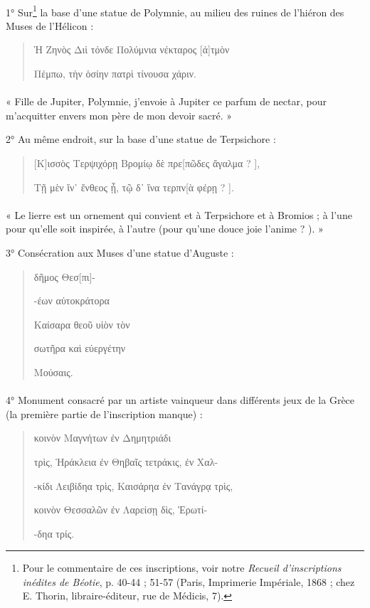 \documentclass[landscape, a4paper, 11pt, oneside, polutonikogreek, french]{article}
\begin{document}
\paragraph{}
1° Sur\footnote{Pour le commentaire de ces inscriptions, voir notre \emph{Recueil d'inscriptions inédites de Béotie}, p. 40-44 ; 51-57 (Paris, Imprimerie Impériale, 1868 ; chez E. Thorin, libraire-éditeur, rue de Médicis, 7).} la base d'une statue de Polymnie, au milieu des ruines de l'hiéron des Muses de l'Hélicon :
\begin{quotation}
Ἡ Ζηνὸς Διὶ τόνδε Πολύμνια νέκταρος [ἀ]τμὸν

\hspace*{5mm}Πέμπω, τὴν ὁσίην πατρὶ τίνουσα χάριν.
\end{quotation}
\paragraph{}
« Fille de Jupiter, Polymnie, j'envoie à Jupiter ce parfum de nectar, pour m'acquitter envers mon père de mon devoir sacré. »

2° Au même endroit, sur la base d'une statue de Terpsichore :
\begin{quotation}
[Κ]ισσὸς Τερψιχόρῃ Βρομίῳ δὲ πρε[πῶδες ἄγαλμα ? ],

\hspace*{5mm}Τῇ μὲν ἵν᾿ ἔνθεος ᾖ, τῷ δ᾽ ἵνα τερπν[ὰ φέρῃ ? ].
\end{quotation}
\paragraph{}
« Le lierre est un ornement qui convient et à Terpsichore et à Bromios ; à l'une pour qu'elle soit inspirée, à l'autre (pour qu'une douce joie l'anime ? ). »

3° Consécration aux Muses d'une statue d'Auguste :
\begin{quotation}
\centering
[Ὁ] δῆμος Θεσ[πι]-

-έων αὐτοκράτορα

Καίσαρα θεοῦ υἱὸν τὸν

σωτῆρα καὶ εὐεργέτην

Μούσαις.
\end{quotation}
\paragraph{}
4° Monument consacré par un artiste vainqueur dans différents jeux de la Grèce (la première partie de l'inscription manque) :
\begin{quotation}
\hspace*{5mm}κοινὸν Μαγνήτων ἐν Δημητριάδι

τρὶς, Ἡράκλεια ἐν Θηβαῖς τετράκις, ἐν Χαλ-

-κίδι Λειβίδηα τρὶς, Καισάρηα ἐν Τανάγρᾳ τρὶς,

κοινὸν Θεσσαλῶν ἐν Λαρείσῃ δὶς, Ἑρωτί-

-δηα τρίς.
\end{quotation}
\end{document}
